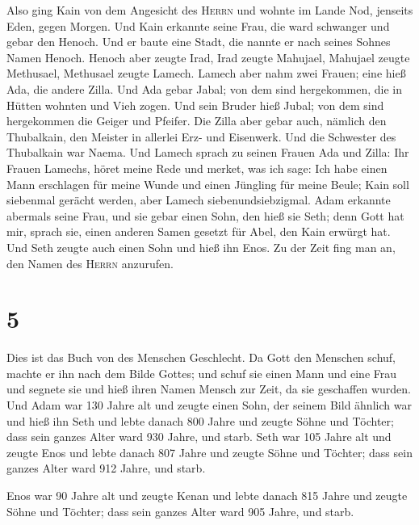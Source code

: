  Also ging Kain von dem Angesicht des \textsc{Herrn} und
wohnte im Lande Nod, jenseits Eden, gegen Morgen.  Und
Kain erkannte seine Frau, die ward schwanger und gebar den Henoch. Und
er baute eine Stadt, die nannte er nach seines Sohnes Namen Henoch.
 Henoch aber zeugte Irad, Irad zeugte Mahujael, Mahujael
zeugte Methusael, Methusael zeugte Lamech.  Lamech aber
nahm zwei Frauen; eine hieß Ada, die andere Zilla.  Und
Ada gebar Jabal; von dem sind hergekommen, die in Hütten wohnten und
Vieh zogen.  Und sein Bruder hieß Jubal; von dem sind
hergekommen die Geiger und Pfeifer.  Die Zilla aber gebar
auch, nämlich den Thubalkain, den Meister in allerlei Erz- und
Eisenwerk. Und die Schwester des Thubalkain war Naema. 
Und Lamech sprach zu seinen Frauen Ada und Zilla: Ihr Frauen Lamechs,
höret meine Rede und merket, was ich sage: Ich habe einen Mann
erschlagen für meine Wunde und einen Jüngling für meine Beule;
 Kain soll siebenmal gerächt werden, aber Lamech
siebenundsiebzigmal.  Adam erkannte abermals seine Frau,
und sie gebar einen Sohn, den hieß sie Seth; denn Gott hat mir, sprach
sie, einen anderen Samen gesetzt für Abel, den Kain erwürgt hat.
 Und Seth zeugte auch einen Sohn und hieß ihn Enos. Zu
der Zeit fing man an, den Namen des \textsc{Herrn} anzurufen.

\hypertarget{section-4}{%
\section{5}\label{section-4}}

 Dies ist das Buch von des Menschen Geschlecht. Da Gott
den Menschen schuf, machte er ihn nach dem Bilde Gottes; 
und schuf sie einen Mann und eine Frau und segnete sie und hieß ihren
Namen Mensch zur Zeit, da sie geschaffen wurden.  Und Adam
war 130 Jahre alt und zeugte einen Sohn, der seinem Bild ähnlich war und
hieß ihn Seth  und lebte danach 800 Jahre und zeugte Söhne
und Töchter;  dass sein ganzes Alter ward 930 Jahre, und
starb.  Seth war 105 Jahre alt und zeugte Enos
 und lebte danach 807 Jahre und zeugte Söhne und Töchter;
 dass sein ganzes Alter ward 912 Jahre, und starb.

 Enos war 90 Jahre alt und zeugte Kenan 
und lebte danach 815 Jahre und zeugte Söhne und Töchter; 
dass sein ganzes Alter ward 905 Jahre, und starb.

